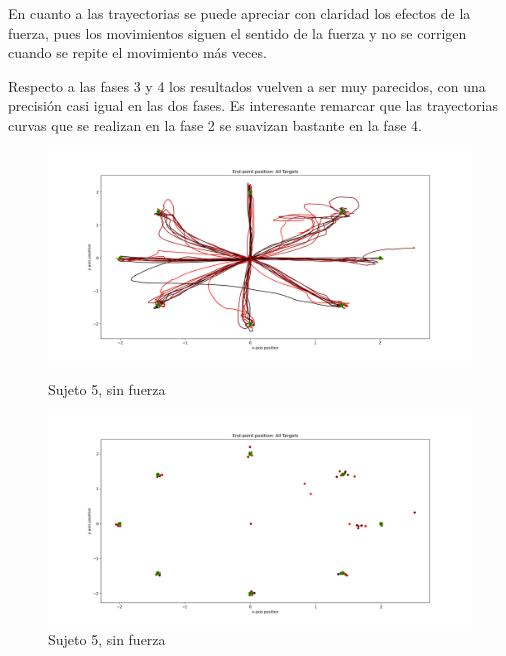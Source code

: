 \documentclass[a4paper,11pt, oneside]{book}
\begin{document}
En cuanto a las trayectorias se puede apreciar con claridad los efectos de la fuerza, pues los movimientos siguen el sentido de la fuerza y no se corrigen cuando se repite el movimiento más veces.

Respecto a las fases 3 y 4 los resultados vuelven a ser muy parecidos, con una precisión casi igual en las dos fases. Es interesante remarcar que las trayectorias curvas que se realizan en la fase 2 se suavizan bastante en la fase 4. 

\begin{figure}[H]
	\begin{minipage}[b]{0.5\linewidth}
		\centering
		\includegraphics[width=\linewidth]{sujeto5/no_force/trayectorias}
		\caption{Sujeto 5, sin fuerza}
		\label{fig:figura1}
	\end{minipage}
	\hspace{0.5cm}
	\begin{minipage}[b]{0.5\linewidth}
		\centering
		\includegraphics[width=\linewidth]{sujeto5/no_force/trayectorias_puntos}
		\caption{Sujeto 5, sin fuerza}
		\label{fig:figura2}
	\end{minipage}
\end{figure}
\end{document}
